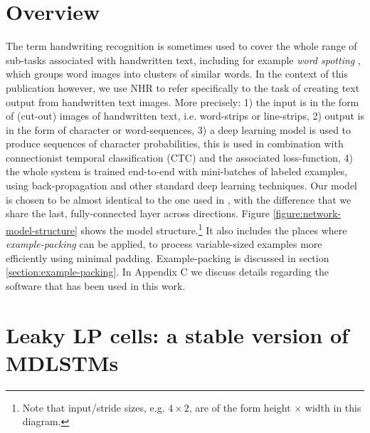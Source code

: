 \documentclass[conference]{IEEEtran}
\renewcommand{\ac}[1]{\gls{#1}}
\begin{document}
\section{Overview}
The term handwriting recognition is sometimes used to cover the whole range of sub-tasks associated with handwritten text, 
including for example \emph{word spotting} \cite{RathAndManmatha2007, FischerEtAl:2012}, which groups word images into clusters of similar 
words. In the context of this publication however, we use \ac{NHR} to refer specifically to the task of creating text output from 
handwritten text images. More precisely: 1) the input is in the form of (cut-out) images of handwritten text, i.e. word-strips or line-strips, 2) output is in the form of character or word-sequences, 3) a deep learning model is used to produce sequences 
of character probabilities, this is used in combination with connectionist temporal classification (CTC) \cite{Graves:2006:CTC}
and the associated loss-function, 4) the whole system is trained end-to-end with mini-batches of labeled examples, using 
back-propagation and other standard deep learning techniques.
Our  model is chosen to be almost identical to the one used in \cite{PhamEtAl2014}, 
with the difference that we share the last, fully-connected layer across directions.
Figure \ref{figure:network-model-structure} shows the model structure.\footnote{Note that input/stride sizes, e.g.  $4 \times 2$, are of the form height $\times$ width in this diagram.}
It also includes the places where \emph{example-packing} can be applied,
to process variable-sized examples more efficiently using minimal padding. Example-packing is discussed in section \ref{section:example-packing}.
In Appendix C we discuss details regarding the software that has been used in this work.


\section{Leaky LP cells: a stable version of MDLSTMs}
\label{section:leaky-lp-cells}
\end{document}
